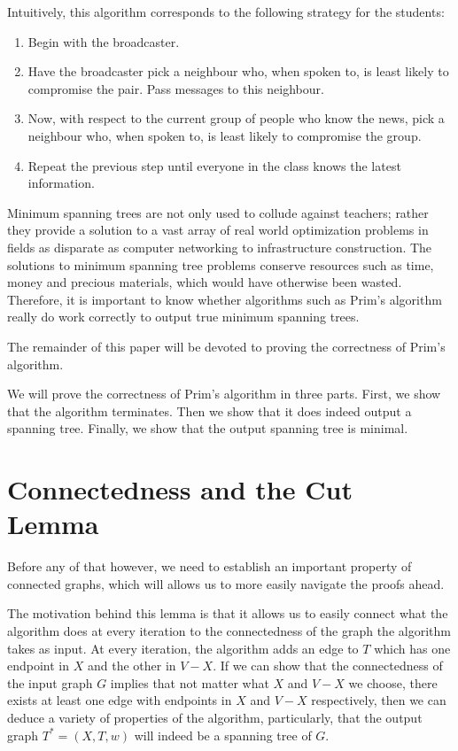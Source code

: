 \documentclass[a4paper,11pt]{report}
\theoremstyle{plain}
\theoremstyle{definition}
\begin{document}
Intuitively, this algorithm corresponds to the following strategy for the
students:

\begin{enumerate}
    \item Begin with the broadcaster.
    \item Have the broadcaster pick a neighbour who, when spoken to, is least
    likely to compromise the pair. Pass messages to this neighbour.
    \item Now, with respect to the current group of people who know the news,
    pick a neighbour who, when spoken to, is least likely to compromise the
    group.
    \item Repeat the previous step until everyone in the class knows the latest
    information.
\end{enumerate}

Minimum spanning trees are not only used to collude against teachers; rather
they provide a solution to a vast array of real world optimization problems
in fields as disparate as computer networking to infrastructure construction.
The solutions to minimum spanning tree problems conserve resources such as
time, money and precious materials, which would have otherwise been wasted.
Therefore, it is important to know whether algorithms such as Prim's
algorithm really do work correctly to output true minimum spanning trees.

The remainder of this paper will be devoted to proving the correctness of
Prim's algorithm.

We will prove the correctness of Prim's algorithm in three parts. First, we
show that the algorithm terminates. Then we show that it does indeed
output a spanning tree. Finally, we show that the output spanning tree
is minimal.

\section{Connectedness and the Cut Lemma}

Before any of that however, we need to establish an important property of
connected graphs, which will allows us to more easily navigate the proofs
ahead.

The motivation behind this lemma is that it allows us to easily connect
what the algorithm does at every iteration to the connectedness of the graph
the algorithm takes as input. At every iteration, the algorithm adds an
edge to $T$ which has one endpoint in $X$ and the other in $V - X$. If we
can show that the connectedness of the input graph $G$ implies that not matter
what $X$ and $V - X$ we choose, there exists at least one edge with
endpoints in $X$ and $V - X$ respectively, then we can deduce a variety of
properties of the algorithm, particularly, that the output graph
$T^* = (X, T, w)$ will indeed be a spanning tree of $G$.
\end{document}
